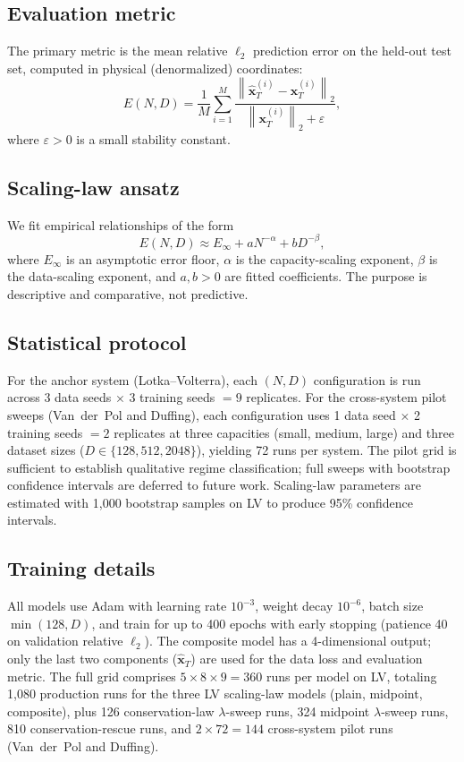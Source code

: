 \documentclass[11pt]{article}
\begin{document}
\subsection{Evaluation metric}

The primary metric is the mean relative $\ell_2$ prediction error on the held-out test set, computed in physical (denormalized) coordinates:
\[
E(N,D) = \frac{1}{M}\sum_{i=1}^{M}
\frac{\left\| \hat{\bm{x}}_T^{(i)} - \bm{x}_T^{(i)} \right\|_2}
{\left\| \bm{x}_T^{(i)} \right\|_2 + \varepsilon},
\]
where $\varepsilon > 0$ is a small stability constant.

\subsection{Scaling-law ansatz}

We fit empirical relationships of the form
\begin{equation}
E(N,D) \approx E_\infty + aN^{-\alpha} + bD^{-\beta},
\label{eq:scaling}
\end{equation}
where $E_\infty$ is an asymptotic error floor, $\alpha$ is the capacity-scaling exponent, $\beta$ is the data-scaling exponent, and $a,b > 0$ are fitted coefficients.
The purpose is descriptive and comparative, not predictive.

\subsection{Statistical protocol}

For the anchor system (Lotka--Volterra), each $(N, D)$ configuration is run across 3 data seeds $\times$ 3 training seeds $= 9$ replicates.
For the cross-system pilot sweeps (Van~der~Pol and Duffing), each configuration uses 1 data seed $\times$ 2 training seeds $= 2$ replicates at three capacities (small, medium, large) and three dataset sizes ($D \in \{128, 512, 2048\}$), yielding 72 runs per system.
The pilot grid is sufficient to establish qualitative regime classification; full sweeps with bootstrap confidence intervals are deferred to future work.
Scaling-law parameters are estimated with 1{,}000 bootstrap samples on LV to produce 95\% confidence intervals.

\subsection{Training details}

All models use Adam with learning rate $10^{-3}$, weight decay $10^{-6}$, batch size $\min(128, D)$, and train for up to 400 epochs with early stopping (patience 40 on validation relative $\ell_2$).
The composite model has a 4-dimensional output; only the last two components ($\hat{\bm{x}}_T$) are used for the data loss and evaluation metric.
The full grid comprises $5 \times 8 \times 9 = 360$ runs per model on LV, totaling 1{,}080 production runs for the three LV scaling-law models (plain, midpoint, composite), plus 126 conservation-law $\lambda$-sweep runs, 324 midpoint $\lambda$-sweep runs, 810 conservation-rescue runs, and $2 \times 72 = 144$ cross-system pilot runs (Van~der~Pol and Duffing).
\end{document}
